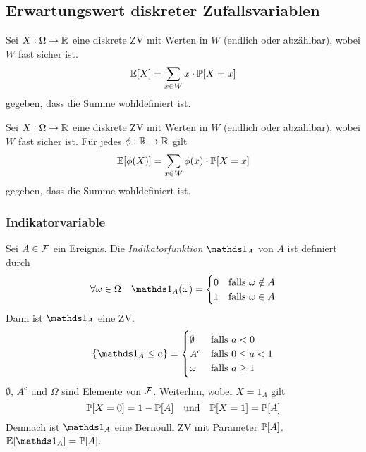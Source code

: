 \subsection{Erwartungswert diskreter Zufallsvariablen}%
\label{sub:erwartungswert_diskreter_zufallsvariablen}

\begin{prop}
	Sei $X : \Omega \rightarrow \mathbb{R}$ eine diskrete ZV mit Werten in $W$ (endlich oder abzählbar), wobei $W$ fast sicher
	ist.
	\begin{equation*}
		\mathbb{E} [X] = \sum_{x \in W} x \cdot \mathbb{P} [X = x]
	\end{equation*}
	gegeben, dass die Summe wohldefiniert ist.
\end{prop}
\begin{prop}
	Sei $X : \Omega \rightarrow \mathbb{R}$ eine diskrete ZV mit Werten in $W$ (endlich oder abzählbar), wobei $W$ fast sicher
	ist. Für jedes $\phi : \mathbb{R} \rightarrow \mathbb{R}$ gilt
	\begin{equation*}
		\mathbb{E} [\phi (X)] = \sum_{x \in W} \phi (x) \cdot \mathbb{P} [X = x]
	\end{equation*}
	gegeben, dass die Summe wohldefiniert ist.
\end{prop}

\subsubsection{Indikatorvariable}%
\label{ssub:indikatorvariable}

Sei $A \in \mathcal{F}$ ein Ereignis. Die \emph{Indikatorfunktion} $\indf$ von $A$ ist definiert durch
\begin{equation*}
	\forall \omega \in \Omega \quad \indf (\omega) = 
	\begin{cases}
		0 & \text{falls} ~ \omega \notin A\\
		1 & \text{falls} ~ \omega \in A
	\end{cases}
\end{equation*}
Dann ist $\indf$ eine ZV.
\begin{equation*}
	\{\indf \leq a \} = 
	\begin{cases}
		\emptyset & \text{falls}~a < 0\\
		A^c & \text{falls}~ 0 \leq a < 1\\
		\omega & \text{falls}~ a \geq 1
	\end{cases}
\end{equation*}
$\emptyset$, $A^c$ und $\Omega$ sind Elemente von $\mathcal{F}$. Weiterhin, wobei $X = 1_A$ gilt
\begin{equation*}
	\mathbb{P} [X = 0] = 1 - \mathbb{P} [A] \quad \text{und} \quad \mathbb{P} [X = 1] = \mathbb{P} [A]
\end{equation*}
Demnach ist $\indf$ eine Bernoulli ZV mit Parameter $\mathbb{P} [A]$. $\E [\indf] = \pr [A]$.
\ssubend


